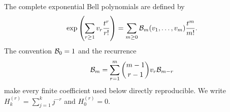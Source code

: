 The complete exponential Bell polynomials are defined by
\begin{equation}\label{qspec:eq:bell}
\exp\left(\sum_{r\ge1}v_r\frac{t^r}{r!}\right)
=\sum_{m\ge0}\mathcal B_m(v_1,\ldots,v_m)\frac{t^m}{m!}.
\end{equation}
The convention $\mathcal B_0=1$ and the recurrence
\begin{equation}\label{qspec:eq:bell-recurrence}
\mathcal B_m=\sum_{r=1}^m\binom{m-1}{r-1}v_r\mathcal B_{m-r}
\end{equation}
make every finite coefficient used below directly reproducible. We write
$H_k^{(r)}=\sum_{j=1}^k j^{-r}$ and $H_0^{(r)}=0$.
